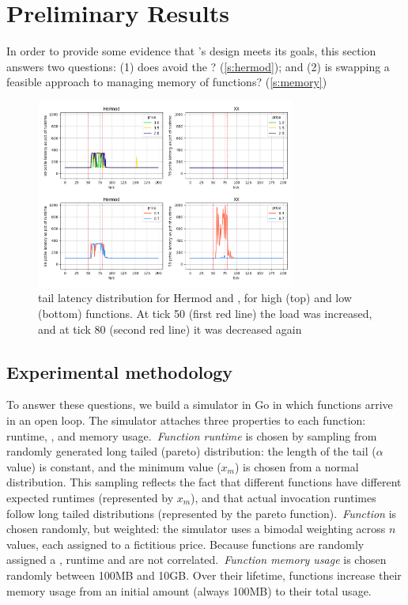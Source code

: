 \section{Preliminary Results}

In order to provide some evidence that \sys{}'s design meets its goals,
this section answers two questions: (1) does \sys{} avoid the \problem?
(\autoref{s:hermod}); and (2) is swapping a feasible approach to
managing memory of functions? (\autoref{s:memory})

\begin{figure}[t!]
    \centering
      \includegraphics[width=8.5cm]{img/hermod_xx_latencies.png}
      \caption{ tail latency distribution for Hermod and \sys{}, for high (top)
      and low (bottom) \priceclass{} functions. At tick 50 (first red line) the
      load was increased, and at tick 80 (second red line) it was decreased again
      }
    \label{fig:hermod-xx-latencies}
\end{figure}


\subsection{Experimental methodology}

To answer these questions, we build a simulator in Go\cite{golang} in
which functions arrive in an open loop. The simulator attaches three
properties to each function: runtime, \priceclass{}, and memory
usage.~\textit{Function runtime} is chosen by sampling from randomly
generated long tailed (pareto) distribution: the length of the tail
($\alpha$ value) is constant, and the minimum value ($x_m$) is chosen
from a normal distribution. This sampling reflects the fact that
different functions have different expected runtimes (represented by
$x_m$), and that actual invocation runtimes follow long tailed
distributions (represented by the pareto function).~\textit{Function
  \class{}} is chosen randomly, but weighted: the simulator uses a
bimodal weighting across $n$ \priceclass{} values, each assigned to a
fictitious price. Because functions are randomly assigned a \class{},
runtime and \class{} are not correlated.~\textit{Function memory
  usage} is chosen randomly between 100MB and 10GB. Over their
lifetime, functions increase their memory usage from an initial amount
(always 100MB) to their total usage.


